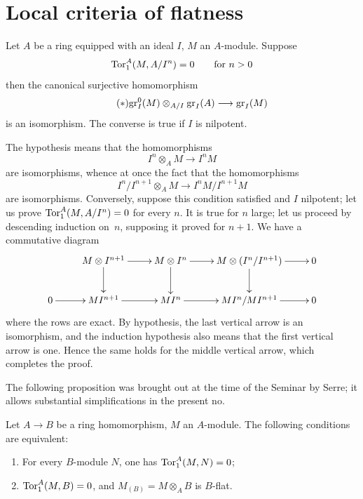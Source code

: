 \section{Local criteria of flatness}
\label{IV.5}

\begin{proposition}
\label{IV.5.1}
Let $A$ be a ring equipped with an ideal $I$, $M$ an
$A$-module. Suppose
$$
\operatorname{Tor}_1^A(M, A/I^n) = 0 \qquad \text{for $n>0$}
$$
then the canonical surjective homomorphism
\begin{equation*}
\label{eq:IV.5.1.*}
\tag{$*$} {\gr_I^0(M) \otimes_{A/I} \gr_I(A) \to \gr_I(M)}
\end{equation*}
is an isomorphism. The converse is true if $I$ is nilpotent.
\end{proposition}

The hypothesis means that the homomorphisms
$$
I^n \otimes_A M \to I^n M
$$
are isomorphisms, whence at once the fact that the
homomorphisms
$$
I^n / I^{n+1} \otimes_A M \to I^n M / I^{n+1} M
$$
are isomorphisms. Conversely, suppose this condition
satisfied and $I$ nilpotent; let us prove $\operatorname{Tor}_1^A(M,A/I^n) =0$
for every $n$. It is true for $n$ large; let us proceed by
descending induction on~$n$, supposing it proved for
$n+1$. We have a commutative diagram
$$
\xymatrix{ & M \otimes I^{n+1} \ar[r] \ar[d] & M \otimes I^n \ar[r]
\ar[d] & M \otimes(I^n/I^{n+1}) \ar[r] \ar[d] & 0 \\ 0 \ar[r] &
MI^{n+1} \ar[r] & MI^n \ar[r] & MI^n/MI^{n+1} \ar[r] & 0 }
$$
where
the rows are exact. By hypothesis, the last vertical
arrow is an isomorphism, and the induction hypothesis
also means that the first vertical arrow is one. Hence the
same holds for the middle vertical arrow, which
completes the proof.

The following proposition was brought out at the time of the
Seminar by Serre; it allows substantial simplifications
in the present no.
\begin{proposition}
\label{IV.5.2}
Let $A \to B$ be a ring homomorphism, $M$ an $A$-module. The
following conditions are equivalent:
\begin{enumerate}
\item[(i)] For every $B$-module $N$, one has $\operatorname{Tor}_1^A(M,N) = 0$;
\item[(ii)] $\operatorname{Tor}_1^A(M,B) = 0$, and $M_{(B)} = M \otimes_A B$ is
$B$-flat.
\end{enumerate}
\end{proposition}

